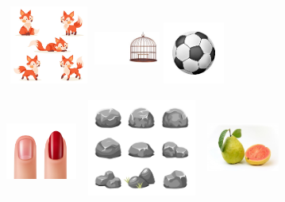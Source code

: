 \includegraphics[width=1.10833in,height=1.00903in]{media/image52.jpeg}
\includegraphics[width=0.85556in,height=0.92222in]{media/image53.jpeg}
\includegraphics[width=0.79808in,height=0.79808in]{media/image54.jpeg}




\includegraphics[width=0.91319in,height=1.16319in]{media/image55.jpeg}
\includegraphics[width=1.62569in,height=1.25000in]{media/image56.jpeg}
\includegraphics[width=0.93990in,height=1.27885in]{media/image57.jpeg}


